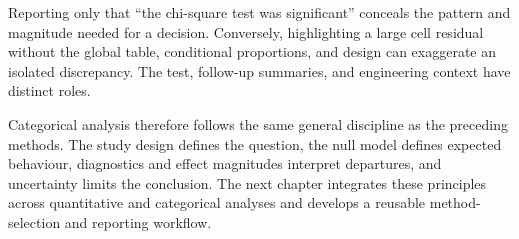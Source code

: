 Reporting only that ``the chi-square test was significant'' conceals the pattern and magnitude needed for a decision. Conversely, highlighting a large cell residual without the global table, conditional proportions, and design can exaggerate an isolated discrepancy. The test, follow-up summaries, and engineering context have distinct roles.

Categorical analysis therefore follows the same general discipline as the preceding methods. The study design defines the question, the null model defines expected behaviour, diagnostics and effect magnitudes interpret departures, and uncertainty limits the conclusion. The next chapter integrates these principles across quantitative and categorical analyses and develops a reusable method-selection and reporting workflow.
